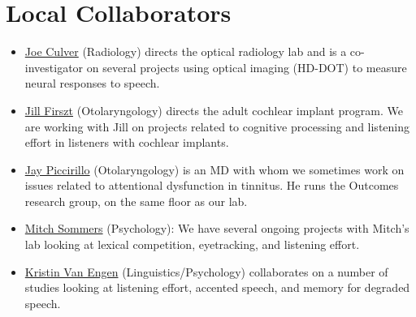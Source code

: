 \documentclass[letterpaper,12pt,oneside]{memoir}
\begin{document}
\section{Local Collaborators}
\begin{itemize}
\item{\href{http://orl.wustl.edu/culver.html}{Joe Culver} (Radiology) directs the optical radiology lab and is a co-investigator on several projects using optical imaging (HD-DOT) to measure neural responses to speech.}
\item{\href{http://otocore.wustl.edu/firsztlab/Home.aspx}{Jill Firszt} (Otolaryngology) directs the adult cochlear implant program. We are working with Jill on projects related to cognitive processing and listening effort in listeners with cochlear implants.}
\item{\href{http://otooutcomes.wustl.edu}{Jay Piccirillo} (Otolaryngology) is an MD with whom we sometimes work on issues related to attentional dysfunction in tinnitus. He runs the Outcomes research group, on the same floor as our lab.}
\item{\href{http://psychweb.wustl.edu/sommers}{Mitch Sommers} (Psychology): We have several ongoing projects with Mitch's lab looking at lexical competition, eyetracking, and listening effort.}
\item{\href{http://kristinvanengen.wordpress.com}{Kristin Van Engen} (Linguistics/Psychology) collaborates on a number of studies looking at listening effort, accented speech, and memory for degraded speech.}
\end{itemize}
\end{document}
